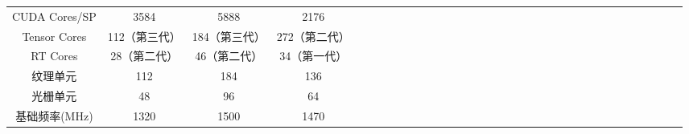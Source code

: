 \documentclass[a4paper]{article}
\begin{document}
\begin{table}[!htbp]
\begin{tabular}{|c|c|c|c|lllllllllllllllllllllllllllll}
CUDA Cores/SP                                               & 3584                                                                   & 5888                                                                   & 2176                                                                                        &  &  &  &  &  &  &  &  &  &  &  &  &  &  &  &  &  &  &  &  &  &  &  &  &  &  &  &  &  \\ \cline{1-4}
Tensor Cores                                                & 112（第三代）                                                               & 184（第三代）                                                               & 272（第二代）                                                                                    &  &  &  &  &  &  &  &  &  &  &  &  &  &  &  &  &  &  &  &  &  &  &  &  &  &  &  &  &  \\ \cline{1-4}
RT Cores                                                    & 28（第二代）                                                                & 46（第二代）                                                                & 34（第一代）                                                                                     &  &  &  &  &  &  &  &  &  &  &  &  &  &  &  &  &  &  &  &  &  &  &  &  &  &  &  &  &  \\ \cline{1-4}
纹理单元                                                        & 112                                                                    & 184                                                                    & 136                                                                                         &  &  &  &  &  &  &  &  &  &  &  &  &  &  &  &  &  &  &  &  &  &  &  &  &  &  &  &  &  \\ \cline{1-4}
光栅单元                                                        & 48                                                                     & 96                                                                     & 64                                                                                          &  &  &  &  &  &  &  &  &  &  &  &  &  &  &  &  &  &  &  &  &  &  &  &  &  &  &  &  &  \\ \cline{1-4}
基础频率(MHz)                                                   & 1320                                                                   & 1500                                                                   & 1470                                                                                        &  &  &  &  &  &  &  &  &  &  &  &  &  &  &  &  &  &  &  &  &  &  &  &  &  &  &  &  &  \\ \cline{1-4}

\end{tabular}
\end{table}
\end{document}
